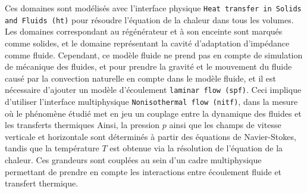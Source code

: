 

Ces domaines sont modélisés avec l'interface physique \texttt{Heat transfer in Solids and Fluids (ht)} pour résoudre l'équation de la chaleur dans tous les volumes. Les domaines correspondant au régénérateur et à son enceinte sont marqués comme solides, et le domaine représentant la cavité d'adaptation d'impédance comme fluide. Cependant, ce modèle fluide ne prend pas en compte de simulation de mécanique des fluides, et pour prendre la gravité et le mouvement du fluide causé par la convection naturelle en compte dans le modèle fluide, et il est nécessaire d'ajouter un modèle d'écoulement \texttt{laminar flow (spf)}. Ceci implique d'utiliser l'interface multiphysique \texttt{Nonisothermal flow (nitf)}, dans la mesure où le phénomène étudié met en jeu un couplage entre la dynamique des fluides et les transferts thermiques Ainsi, la pression $p$ ainsi que les champs de vitesse verticale et horizontale sont déterminés à partir des équations de Navier-Stokes, tandis que la température $T$ est obtenue via la résolution de l’équation de la chaleur. Ces grandeurs sont couplées au sein d’un cadre multiphysique permettant de prendre en compte les interactions entre écoulement fluide et transfert thermique.\medskip


